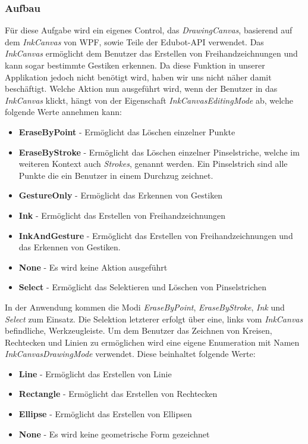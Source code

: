 \subsubsection{Aufbau}
Für diese Aufgabe wird ein eigenes Control, das \textit{DrawingCanvas}, basierend auf dem \textit{InkCanvas} von WPF, sowie Teile der Edubot-API verwendet. Das \textit{InkCanvas} ermöglicht dem Benutzer das Erstellen von Freihandzeichnungen und kann sogar bestimmte Gestiken erkennen. Da diese Funktion in unserer Applikation jedoch nicht benötigt wird, haben wir uns nicht näher damit beschäftigt. Welche Aktion nun ausgeführt wird, wenn der Benutzer in das \textit{InkCanvas} klickt, hängt von der Eigenschaft \textit{InkCanvasEditingMode} ab, welche folgende Werte annehmen kann:
\begin{itemize}
\item \textbf{EraseByPoint} - Ermöglicht das Löschen einzelner Punkte
\item \textbf{EraseByStroke} - Ermöglicht das Löschen einzelner Pinselstriche, welche im weiteren Kontext auch \textit{Strokes}, genannt werden. Ein Pinselstrich sind alle Punkte die ein Benutzer in einem Durchzug zeichnet.
\item \textbf{GestureOnly} - Ermöglicht das Erkennen von Gestiken
\item \textbf{Ink} - Ermöglicht das Erstellen von Freihandzeichnungen
\item \textbf{InkAndGesture} - Ermöglicht das Erstellen von Freihandzeichnungen und das Erkennen von Gestiken.
\item \textbf{None} - Es wird keine Aktion ausgeführt
\item \textbf{Select} - Ermöglicht das Selektieren und Löschen von Pinselstrichen
\end{itemize}
In der Anwendung kommen die Modi \textit{EraseByPoint}, \textit{EraseByStroke}, \textit{Ink} und \textit{Select} zum Einsatz. Die Selektion letzterer erfolgt über eine, links vom \textit{InkCanvas} befindliche, Werkzeugleiste. Um dem Benutzer das Zeichnen von Kreisen, Rechtecken und Linien zu ermöglichen wird eine eigene Enumeration mit Namen \textit{InkCanvasDrawingMode} verwendet. Diese beinhaltet folgende Werte:
\begin{itemize}
\item \textbf{Line} - Ermöglicht das Erstellen von Linie
\item \textbf{Rectangle} - Ermöglicht das Erstellen von Rechtecken
\item \textbf{Ellipse} - Ermöglicht das Erstellen von Ellipsen
\item \textbf{None} - Es wird keine geometrische Form gezeichnet
\end{itemize}
